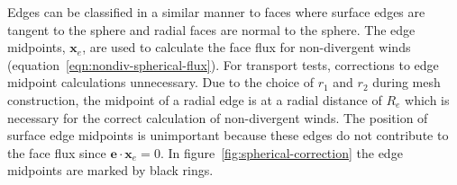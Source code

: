 
Edges can be classified in a similar manner to faces where surface edges are tangent to the sphere and radial faces are normal to the sphere.  The edge midpoints, $\mathbf{x}_e$, are used to calculate the face flux for non-divergent winds (equation~\eqref{eqn:nondiv-spherical-flux}).
For transport tests, corrections to edge midpoint calculations unnecessary.  Due to the choice of $r_1$ and $r_2$ during mesh construction, the midpoint of a radial edge is at a radial distance of $R_e$ which is necessary for the correct calculation of non-divergent winds.
The position of surface edge midpoints is unimportant because these edges do not contribute to the face flux since $\mathbf{e} \cdot \mathbf{x}_e = 0$.
In figure~\ref{fig:spherical-correction} the edge midpoints are marked by black rings.

